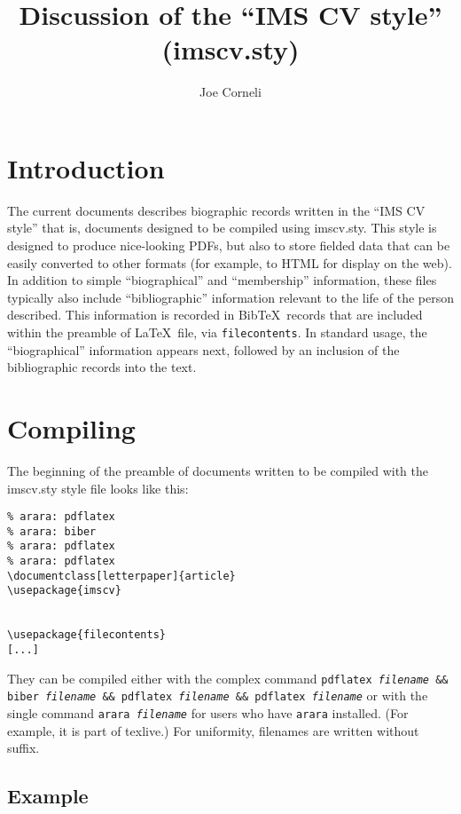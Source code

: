 \documentclass[letterpaper]{article}
\begin{document}
\title{Discussion of the ``IMS CV style'' (imscv.sty)}
\author{Joe Corneli}

\maketitle

\section{Introduction}

The current documents describes biographic records written in the
``IMS CV style'' that is, documents designed to be compiled using
imscv.sty.  This style is designed to produce nice-looking PDFs, but
also to store fielded data that can be easily converted to other
formats (for example, to HTML for display on the web).  In addition to
simple ``biographical'' and ``membership'' information, these files
typically also include ``bibliographic'' information relevant to the
life of the person described.  This information is recorded in
Bib\TeX\ records that are included within the preamble of
\LaTeX\ file, via {\tt filecontents}.  In standard usage, the
``biographical'' information appears next, followed by an inclusion of
the bibliographic records into the text.


\section{Compiling}

The beginning of the preamble of documents written to be compiled with
the imscv.sty style file looks like this:

\begin{verbatim}
% arara: pdflatex
% arara: biber
% arara: pdflatex
% arara: pdflatex
\documentclass[letterpaper]{article}
\usepackage{imscv}


\usepackage{filecontents}
[...]
\end{verbatim}

They can be compiled either with the complex command {\tt pdflatex
  \emph{filename} \&\& biber \emph{filename} \&\& pdflatex
  \emph{filename} \&\& pdflatex \emph{filename}} or with the single
command {\tt arara \emph{filename}} for users who have {\tt arara}
installed.  (For example, it is part of texlive.)  For uniformity,
filenames are written without suffix.

\subsection*{Example}
\end{document}
